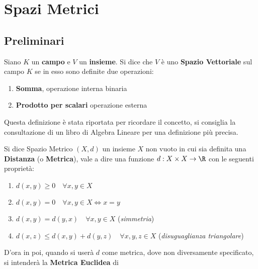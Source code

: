 \chapter{Spazi Metrici}

\section{Preliminari}

\begin{definition}
	Siano $K$ un \textbf{campo} e $V$ un \textbf{insieme}. Si dice che $V$ è uno \textbf{Spazio Vettoriale} sul campo $K$ se in esso sono definite due operazioni:
	\begin{enumerate}
		\item \textbf{Somma}, operazione interna binaria
		\item \textbf{Prodotto per scalari} operazione esterna
	\end{enumerate}
	\begin{note}
		Questa definizione è stata riportata per ricordare il concetto, si consiglia la consultazione di un libro di Algebra Lineare per una definizione più precisa.
	\end{note}
\end{definition}

\begin{definition}
	\label{def:sp_metrico}
	Si dice Spazio Metrico $(X,d)$ un insieme $X$ non vuoto in cui sia definita una \textbf{Distanza} (o \textbf{Metrica}), vale a dire una funzione $d: X \times X \to \R$ con le seguenti proprietà:
	\begin{enumerate}
		\item $d(x,y) \geq 0 \quad \forall x,y \in X$
		\item \label{itm:dist_0_iff_x_uguale_y} $d(x,y) = 0 \quad \forall x,y \in X \iff x=y$
		\item $d(x,y) = d(y,x) \quad \forall x,y \in X$ \quad(\textit{simmetria})
		\item $d(x,z) \leq d(x,y)+d(y,z) \quad \forall x,y,z\in X$ \quad(\textit{disuguaglianza triangolare})
	\end{enumerate}
	\begin{note}
		D'ora in poi, quando si userà $d$ come metrica, dove non diversamente specificato, si intenderà la \textbf{Metrica Euclidea} di \hyperref[ex:dist_eucl]{} %
	\end{note}
\end{definition}

